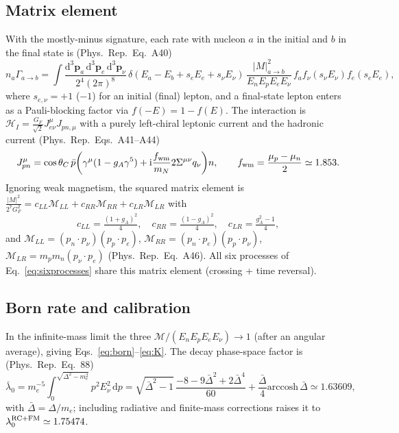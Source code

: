 \documentclass[11pt,a4paper]{article}
\newcommand{\dd}{\mathrm{d}}
\newcommand{\ii}{\mathrm{i}}
\newcommand{\PR}{Phys.\ Rep.}
\newcommand{\Gap}{\Delta}
\newcommand{\cLL}{c_{LL}}
\newcommand{\cRR}{c_{RR}}
\newcommand{\cLR}{c_{LR}}
\begin{document}
\subsection*{Matrix element}
With the mostly-minus signature, each rate with nucleon $a$ in the initial and
$b$ in the final state is (\PR\ Eq.~A40)
\begin{equation}
  n_a\Gamma_{a\to b} = \int\frac{\dd^3\mathbf p_a\,\dd^3\mathbf p_e\,\dd^3\mathbf p_\nu}
     {2^4(2\pi)^8}\,
     \delta(E_a-E_b+s_eE_e+s_\nu E_\nu)\,
     \frac{|M|^2_{a\to b}}{E_nE_pE_eE_\nu}\,
     f_a f_\nu(s_\nu E_\nu) f_e(s_e E_e),
\label{eq:weakgen}
\end{equation}
where $s_{e,\nu}=+1$ ($-1$) for an initial (final) lepton, and a final-state
lepton enters as a Pauli-blocking factor via $f(-E)=1-f(E)$. The interaction is
$\mathcal H_I=\tfrac{G_F}{\sqrt2}J^\mu_{e\nu}J_{pn,\mu}$ with a purely
left-chiral leptonic current and the hadronic current (\PR\ Eqs.~A41--A44)
\begin{equation}
  J^\mu_{pn} = \cos\theta_C\,\bar p\!\left(\gamma^\mu(1-g_A\gamma^5)
    + \ii\frac{f_{\rm wm}}{m_N}2\Sigma^{\mu\nu}q_\nu\right)\! n,
  \qquad f_{\rm wm}=\frac{\mu_p-\mu_n}{2}\simeq1.853 .
\end{equation}
Ignoring weak magnetism, the squared matrix element is
$\tfrac{|M|^2}{2^7G_F^2}=\cLL\mathcal M_{LL}+\cRR\mathcal M_{RR}+\cLR\mathcal M_{LR}$
with
\begin{equation}
  \cLL=\tfrac{(1+g_A)^2}{4},\quad
  \cRR=\tfrac{(1-g_A)^2}{4},\quad
  \cLR=\tfrac{g_A^2-1}{4},
\end{equation}
and $\mathcal M_{LL}=(p_n\!\cdot\!p_\nu)(p_p\!\cdot\!p_e)$,
$\mathcal M_{RR}=(p_n\!\cdot\!p_e)(p_p\!\cdot\!p_\nu)$,
$\mathcal M_{LR}=m_pm_n(p_\nu\!\cdot\!p_e)$ (\PR\ Eq.~A46). All six processes of
Eq.~\eqref{eq:sixprocesses} share this matrix element (crossing + time reversal).

\subsection*{Born rate and calibration}
In the infinite-mass limit the three $\mathcal M/(E_nE_pE_eE_\nu)\to1$ (after an
angular average), giving Eqs.~\eqref{eq:born}--\eqref{eq:K}. The decay
phase-space factor is (\PR\ Eq.~88)
\begin{equation}
  \bar\lambda_0 = m_e^{-5}\!\int_0^{\sqrt{\Gap^2-m_e^2}}\! p^2 E_\nu^2\,\dd p
   = \sqrt{\bar\Gap^2-1}\,\frac{-8-9\bar\Gap^2+2\bar\Gap^4}{60}
     + \frac{\bar\Gap}{4}\mathrm{arccosh}\,\bar\Gap \simeq 1.63609,
\end{equation}
with $\bar\Gap=\Gap/m_e$; including radiative and finite-mass corrections raises
it to $\lambda_0^{\rm RC+FM}\simeq1.75474$.
\end{document}
